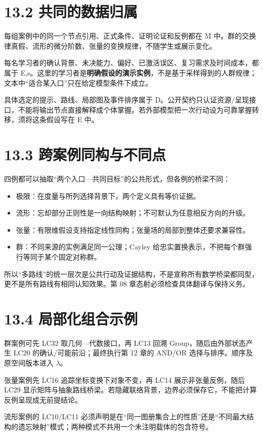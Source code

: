 \documentclass[UTF8,a4paper,zihao=-4,fontset=windows,openany]{ctexbook}
\begin{document}
\section{13.2 共同的数据归属}
每组案例中的同一个节点引用、正式条件、证明论证和反例都在 M 中。群的交换律真假、流形的微分阶数、张量的变换规律，不随学生或展示变化。

每名学习者的确认背景、未决能力、偏好、已激活误区、复习需求及时间成本，都属于 E,s。这里的学习者是\textbf{明确假设的演示实例}，不是基于采样得到的人群规律；文本中“适合某入口”只在给定模型条件下成立。

具体选定的提示、路线、局部图及事件排序属于 D。公开契约只认证资源/呈现接口，不能将输出节点直接解释成个体掌握。若外部模型把一次行动设为可靠掌握转移，须将这条假设写在 E 中。

\section{13.3 跨案例同构与不同点}
四例都可以抽取“两个入口—共同目标”的公共形式，但各例的桥梁不同：

\begin{itemize}
\item 极限：在度量与所列选择背景下，两个定义具有等价证据。
\item 流形：忘却部分正则性是一向结构映射；不可默认为任意相反方向的升级。
\item 张量：有限维假设支持指定线性同构；张量场的局部到整体还要求兼容性。
\item 群：不同来源的实例满足同一公理；Cayley 给忠实置换表示，不把每个群强行等同于某个固定对称群。
\end{itemize}
所以“多路线”的统一层次是公共行动及证据结构，不是宣称所有数学桥梁都同型，更不是所有路线有相同认知效果。第 08 章态射必须检查具体翻译与保持义务。

\section{13.4 局部化组合示例}
群案例可先 LC32 取几何—代数接口，再 LC13 回溯 Group，随后由外部状态产生 LC20 的确认/可能前沿；最终执行第 12 章的 AND/OR 选择与排序。顺序及原空间版本进入 \(\lambda\)。

张量案例先 LC16 追踪坐标变换下对象不变，再 LC14 展示非张量反例，随后 LC29 显示矩阵与抽象路线桥梁。若隐藏联络背景，边界必须保存它，不能把计算反例呈现成无前提结论。

流形案例的 LC10/LC11 必须声明是在“同一图册集合上的性质”还是“不同最大结构的遗忘映射”模式；两种模式不共用一个未注明载体的包含符号。
\end{document}
